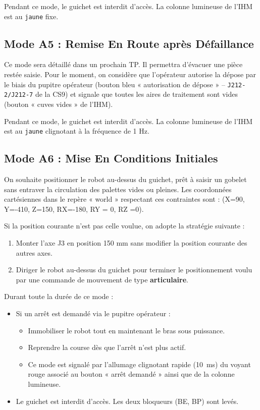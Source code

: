 Pendant ce mode, le guichet est interdit d'accès. La colonne lumineuse de l'IHM est au \texttt{jaune} fixe.

\subsection{Mode A5 : Remise En Route après Défaillance}

Ce mode sera détaillé dans un prochain TP. Il permettra d'évacuer une pièce restée saisie.
Pour le moment, on considère que l'opérateur autorise la dépose par le biais du pupitre opérateur (bouton bleu « autorisation de dépose » -- \texttt{J212-2/J212-7} de la CS9) et signale que toutes les aires de traitement sont vides (bouton « cuves vides » de l'IHM).

Pendant ce mode, le guichet est interdit d'accès. La colonne lumineuse de l'IHM est au \texttt{jaune} clignotant à la fréquence de 1 Hz.

\subsection{Mode A6 : Mise En Conditions Initiales}

On souhaite positionner le robot au-dessus du guichet, prêt à saisir un gobelet sans entraver la circulation des palettes vides ou pleines.
Les coordonnées cartésiennes dans le repère « world » respectant ces contraintes sont : (X=90, Y=-410, Z=150, RX=-180, RY = 0, RZ =0).

Si la position courante n'est pas celle voulue, on adopte la stratégie suivante :
\begin{enumerate}
    \item Monter l'axe J3 en position 150 mm sans modifier la position courante des autres axes.
    \item Diriger le robot au-dessus du guichet pour terminer le positionnement voulu par une commande de mouvement de type \textbf{articulaire}.
\end{enumerate}
Durant toute la durée de ce mode : 
\begin{itemize}
    \item Si un arrêt est demandé via le pupitre opérateur : 
    \begin{itemize}
        \item Immobiliser le robot tout en maintenant le bras sous puissance.
        \item Reprendre la course dès que l'arrêt n'est plus actif.
        \item Ce mode est signalé par l'allumage clignotant rapide (\SI{10}{ms}) du voyant rouge associé au bouton « arrêt demandé » ainsi que de la colonne lumineuse.
    \end{itemize}
    \item Le guichet est interdit d'accès. Les deux bloqueurs (BE, BP) sont levés.
\end{itemize}


